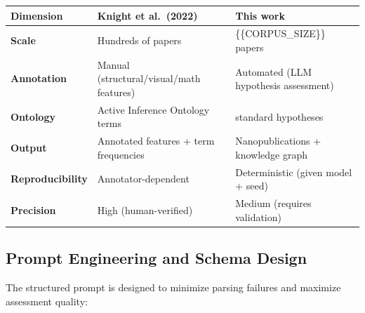 \documentclass[
]{article}
\newcounter{none} %
\begin{document}
{\def\LTcaptype{none} %
\begin{longtable}[]{@{}
  >{\raggedright\arraybackslash}p{}
  >{\raggedright\arraybackslash}p{}
  >{\raggedright\arraybackslash}p{}@{}}
\toprule\noalign{}
\begin{minipage}[b]{\linewidth}\raggedright
Dimension
\end{minipage} & \begin{minipage}[b]{\linewidth}\raggedright
Knight et al.~(2022)
\end{minipage} & \begin{minipage}[b]{\linewidth}\raggedright
This work
\end{minipage} \\
\midrule\noalign{}
\endhead
\bottomrule\noalign{}
\endlastfoot
\textbf{Scale} & Hundreds of papers & \{\{CORPUS\_SIZE\}\} papers \\
\textbf{Annotation} & Manual (structural/visual/math features) &
Automated (LLM hypothesis assessment) \\
\textbf{Ontology} & Active Inference Ontology terms & 8 standard
hypotheses \\
\textbf{Output} & Annotated features + term frequencies &
Nanopublications + knowledge graph \\
\textbf{Reproducibility} & Annotator-dependent & Deterministic (given
model + seed) \\
\textbf{Precision} & High (human-verified) & Medium (requires
validation) \\
\end{longtable}
}

\subsection{Prompt Engineering and Schema
Design}\label{prompt-engineering-and-schema-design}

The structured prompt is designed to minimize parsing failures and
maximize assessment quality:
\end{document}
